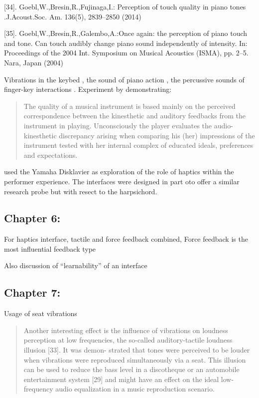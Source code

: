 [34]. Goebl,W.,Bresin,R.,Fujinaga,I.: Perception of touch quality in piano tones .J.Acoust.Soc.
Am. 136(5), 2839–2850 (2014) \cite{goebl_perception_2014}

[35]. Goebl,W.,Bresin,R.,Galembo,A.:Once again: the perception of piano touch and tone. Can
touch audibly change piano sound independently of intensity. In: Proceedings of the 2004 Int.
Symposium on Musical Acoustics (ISMA), pp. 2–5. Nara, Japan (2004)


Vibrations in the keybed \cite{charalampos_role_2018}, the sound of piano action \cite{baron_physical_1958}, the percussive sounds of finger-key interactions \cite{goebl_perception_2014}. Experiment by \textcite{galembo_quality_2003} demonstrating:

\begin{quotation}
    The quality of a musical instrument is based
mainly on the perceived correspondence between
the kinesthetic and auditory feedbacks from the
instrument in playing. Unconsciously the player
evaluates the audio-kinesthetic discrepancy
arising when comparing his (her) impressions of
the instrument tested with her internal complex of
educated ideals, preferences and expectations.
\end{quotation}

\cite{fontana_perceptiom_2018,charalampos_role_2018} used the Yamaha Disklavier as exploration of the role of haptics within the performer experience. The interfaces were designed in part oto offer a similar research probe but with resect to the harpsichord.

\subsection{Chapter 6: \cite{young_musical_2018}}

For haptics interface, tactile and force feedback combined, Force feedback is the most influential feedback type

Also discussion of ``learnability'' of an interface

\subsection{Chapter 7: \cite{merchel_functional_2018}}

Usage of seat vibrations

\begin{quotation}
    Another interesting effect is the influence of vibrations on loudness perception at low frequencies, the so-called auditory-tactile loudness illusion [33]. It was demon- strated that tones were perceived to be louder when vibrations were reproduced simultaneously via a seat. This illusion can be used to reduce the bass level in a discotheque or an automobile entertainment system [29] and might have an effect on the ideal low-frequency audio equalization in a music reproduction scenario.
\end{quotation}


